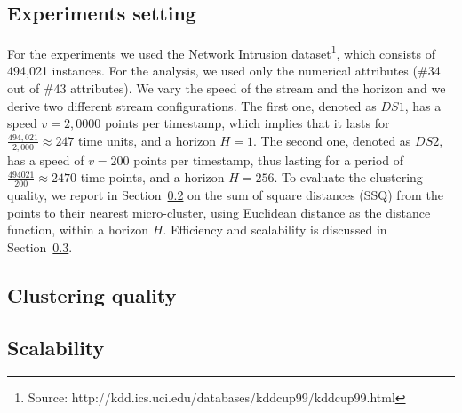 \subsection{Experiments setting}
For the experiments we used the Network Intrusion dataset\footnote{Source: http://kdd.ics.uci.edu/databases/kddcup99/kddcup99.html}, which consists of 494,021 instances. For the analysis, we used only the numerical attributes (\#34 out of \#43 attributes).
We vary the speed of the stream and the horizon and we derive two different stream configurations.
The first one, denoted as $DS1$, has a speed $v=2,0000$ points per timestamp, which implies that it lasts for $\frac{494,021}{2,000} \approx 247$ time units, and a horizon $H=1$. 
The second one, denoted as $DS2$, has a speed of $v=200$ points per timestamp, thus lasting for a period of $\frac{494021}{200} \approx 2470$ time points, and a horizon $H=256$.
To evaluate the clustering quality, we report in Section~\ref{sec:expQuality} on the sum of square distances (SSQ) from the points to their nearest micro-cluster, using Euclidean distance as the distance function, within a horizon $H$. Efficiency and scalability is discussed in Section~\ref{sec:expScalability}. 



\subsection{Clustering quality}
\label{sec:expQuality}



\subsection{Scalability}
\label{sec:expScalability}
